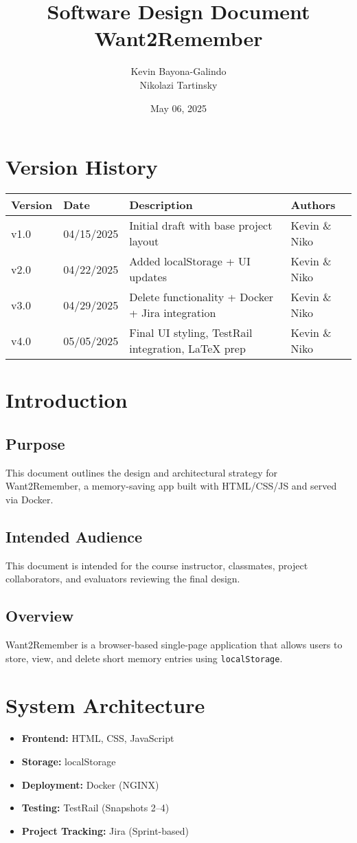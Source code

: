 \documentclass[12pt]{article}
\title{\Huge Software Design Document\\[0.5em]\LARGE Want2Remember}
\author{Kevin Bayona-Galindo \\ Nikolazi Tartinsky}
\date{May 06, 2025}
\begin{document}
\maketitle
\tableofcontents
\newpage

\section*{Version History}
\begin{longtable}{|p{3cm}|p{3cm}|p{6cm}|p{4cm}|}
\hline
\textbf{Version} & \textbf{Date} & \textbf{Description} & \textbf{Authors} \\
\hline
v1.0 & 04/15/2025 & Initial draft with base project layout & Kevin \& Niko \\
\hline
v2.0 & 04/22/2025 & Added localStorage + UI updates & Kevin \& Niko \\
\hline
v3.0 & 04/29/2025 & Delete functionality + Docker + Jira integration & Kevin \& Niko \\
\hline
v4.0 & 05/05/2025 & Final UI styling, TestRail integration, LaTeX prep & Kevin \& Niko \\
\hline
\end{longtable}

\section{Introduction}
\subsection*{Purpose}
This document outlines the design and architectural strategy for Want2Remember, a memory-saving app built with HTML/CSS/JS and served via Docker.

\subsection*{Intended Audience}
This document is intended for the course instructor, classmates, project collaborators, and evaluators reviewing the final design.

\subsection*{Overview}
Want2Remember is a browser-based single-page application that allows users to store, view, and delete short memory entries using \texttt{localStorage}.

\section{System Architecture}
\begin{itemize}
  \item \textbf{Frontend:} HTML, CSS, JavaScript
  \item \textbf{Storage:} localStorage
  \item \textbf{Deployment:} Docker (NGINX)
  \item \textbf{Testing:} TestRail (Snapshots 2--4)
  \item \textbf{Project Tracking:} Jira (Sprint-based)
\end{itemize}
\end{document}
